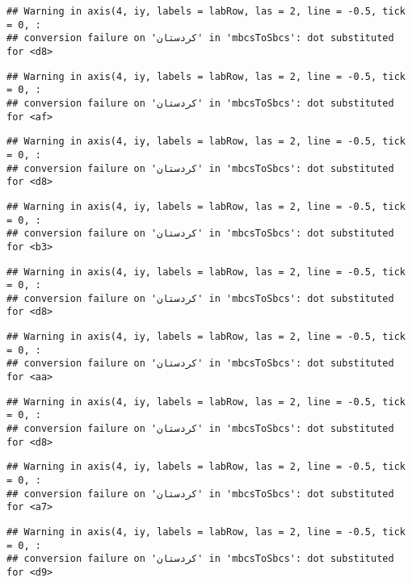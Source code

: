 \documentclass[
]{article}
\begin{document}
\begin{verbatim}
## Warning in axis(4, iy, labels = labRow, las = 2, line = -0.5, tick = 0, :
## conversion failure on 'کردستان' in 'mbcsToSbcs': dot substituted for <d8>
\end{verbatim}

\begin{verbatim}
## Warning in axis(4, iy, labels = labRow, las = 2, line = -0.5, tick = 0, :
## conversion failure on 'کردستان' in 'mbcsToSbcs': dot substituted for <af>
\end{verbatim}

\begin{verbatim}
## Warning in axis(4, iy, labels = labRow, las = 2, line = -0.5, tick = 0, :
## conversion failure on 'کردستان' in 'mbcsToSbcs': dot substituted for <d8>
\end{verbatim}

\begin{verbatim}
## Warning in axis(4, iy, labels = labRow, las = 2, line = -0.5, tick = 0, :
## conversion failure on 'کردستان' in 'mbcsToSbcs': dot substituted for <b3>
\end{verbatim}

\begin{verbatim}
## Warning in axis(4, iy, labels = labRow, las = 2, line = -0.5, tick = 0, :
## conversion failure on 'کردستان' in 'mbcsToSbcs': dot substituted for <d8>
\end{verbatim}

\begin{verbatim}
## Warning in axis(4, iy, labels = labRow, las = 2, line = -0.5, tick = 0, :
## conversion failure on 'کردستان' in 'mbcsToSbcs': dot substituted for <aa>
\end{verbatim}

\begin{verbatim}
## Warning in axis(4, iy, labels = labRow, las = 2, line = -0.5, tick = 0, :
## conversion failure on 'کردستان' in 'mbcsToSbcs': dot substituted for <d8>
\end{verbatim}

\begin{verbatim}
## Warning in axis(4, iy, labels = labRow, las = 2, line = -0.5, tick = 0, :
## conversion failure on 'کردستان' in 'mbcsToSbcs': dot substituted for <a7>
\end{verbatim}

\begin{verbatim}
## Warning in axis(4, iy, labels = labRow, las = 2, line = -0.5, tick = 0, :
## conversion failure on 'کردستان' in 'mbcsToSbcs': dot substituted for <d9>
\end{verbatim}
\end{document}
